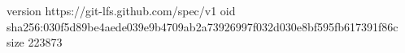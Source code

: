 version https://git-lfs.github.com/spec/v1
oid sha256:030f5d89be4aede039e9b4709ab2a73926997f032d030e8bf595fb617391f86c
size 223873
